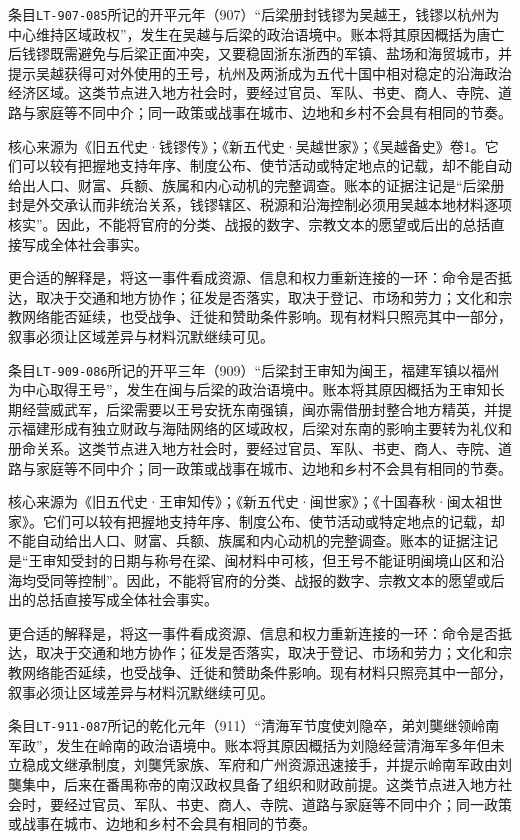 条目\texttt{LT-907-085}所记的开平元年（907）“后梁册封钱镠为吴越王，钱镠以杭州为中心维持区域政权”，发生在吴越与后梁的政治语境中。账本将其原因概括为唐亡后钱镠既需避免与后梁正面冲突，又要稳固浙东浙西的军镇、盐场和海贸城市，并提示吴越获得可对外使用的王号，杭州及两浙成为五代十国中相对稳定的沿海政治经济区域。这类节点进入地方社会时，要经过官员、军队、书吏、商人、寺院、道路与家庭等不同中介；同一政策或战事在城市、边地和乡村不会具有相同的节奏。

核心来源为《旧五代史·钱镠传》；《新五代史·吴越世家》；《吴越备史》卷1。它们可以较有把握地支持年序、制度公布、使节活动或特定地点的记载，却不能自动给出人口、财富、兵额、族属和内心动机的完整调查。账本的证据注记是“后梁册封是外交承认而非统治关系，钱镠辖区、税源和沿海控制必须用吴越本地材料逐项核实”。因此，不能将官府的分类、战报的数字、宗教文本的愿望或后出的总括直接写成全体社会事实。

更合适的解释是，将这一事件看成资源、信息和权力重新连接的一环：命令是否抵达，取决于交通和地方协作；征发是否落实，取决于登记、市场和劳力；文化和宗教网络能否延续，也受战争、迁徙和赞助条件影响。现有材料只照亮其中一部分，叙事必须让区域差异与材料沉默继续可见。

条目\texttt{LT-909-086}所记的开平三年（909）“后梁封王审知为闽王，福建军镇以福州为中心取得王号”，发生在闽与后梁的政治语境中。账本将其原因概括为王审知长期经营威武军，后梁需要以王号安抚东南强镇，闽亦需借册封整合地方精英，并提示福建形成有独立财政与海陆网络的区域政权，后梁对东南的影响主要转为礼仪和册命关系。这类节点进入地方社会时，要经过官员、军队、书吏、商人、寺院、道路与家庭等不同中介；同一政策或战事在城市、边地和乡村不会具有相同的节奏。

核心来源为《旧五代史·王审知传》；《新五代史·闽世家》；《十国春秋·闽太祖世家》。它们可以较有把握地支持年序、制度公布、使节活动或特定地点的记载，却不能自动给出人口、财富、兵额、族属和内心动机的完整调查。账本的证据注记是“王审知受封的日期与称号在梁、闽材料中可核，但王号不能证明闽境山区和沿海均受同等控制”。因此，不能将官府的分类、战报的数字、宗教文本的愿望或后出的总括直接写成全体社会事实。

更合适的解释是，将这一事件看成资源、信息和权力重新连接的一环：命令是否抵达，取决于交通和地方协作；征发是否落实，取决于登记、市场和劳力；文化和宗教网络能否延续，也受战争、迁徙和赞助条件影响。现有材料只照亮其中一部分，叙事必须让区域差异与材料沉默继续可见。

条目\texttt{LT-911-087}所记的乾化元年（911）“清海军节度使刘隐卒，弟刘龑继领岭南军政”，发生在岭南的政治语境中。账本将其原因概括为刘隐经营清海军多年但未立稳成文继承制度，刘龑凭家族、军府和广州资源迅速接手，并提示岭南军政由刘龑集中，后来在番禺称帝的南汉政权具备了组织和财政前提。这类节点进入地方社会时，要经过官员、军队、书吏、商人、寺院、道路与家庭等不同中介；同一政策或战事在城市、边地和乡村不会具有相同的节奏。

